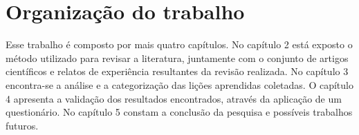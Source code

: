 \section{Organização do trabalho}

Esse trabalho é composto por mais quatro capítulos. No capítulo 2 está exposto o método utilizado para revisar a literatura, juntamente com o conjunto de artigos científicos e relatos de experiência resultantes da revisão realizada. No capítulo 3 encontra-se a análise e a categorização das lições aprendidas coletadas. O capítulo 4 apresenta a validação dos resultados encontrados, através da aplicação de um questionário. No capítulo 5 constam a conclusão da pesquisa e possíveis trabalhos futuros.
